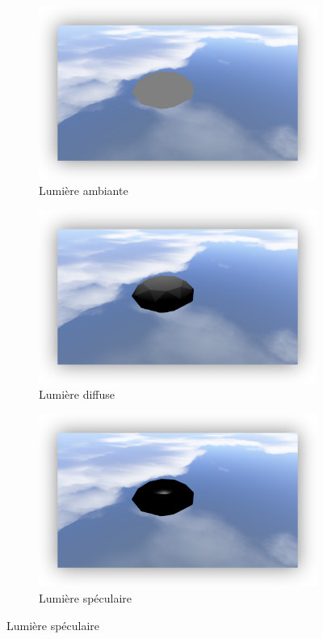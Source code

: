 \documentclass[pdftex, 11pt, a4paper, titlepage]{article}
\begin{document}
\begin{figure}[hbp]
\centering
\begin{subfigure}[b]{0.3\textwidth}
\includegraphics[width=\textwidth]{ssAmbiant}
\caption{Lumière ambiante}
\end{subfigure}\hfill
\begin{subfigure}[b]{0.3\textwidth}
\includegraphics[width=\textwidth]{ssDiffuse}    
\caption{Lumière diffuse}
\end{subfigure}\hfill
\begin{subfigure}[b]{0.3\textwidth}
\includegraphics[width=\textwidth]{ssSpecular}    
\caption{Lumière spéculaire}
\end{subfigure}
\end{figure}
\end{document}
